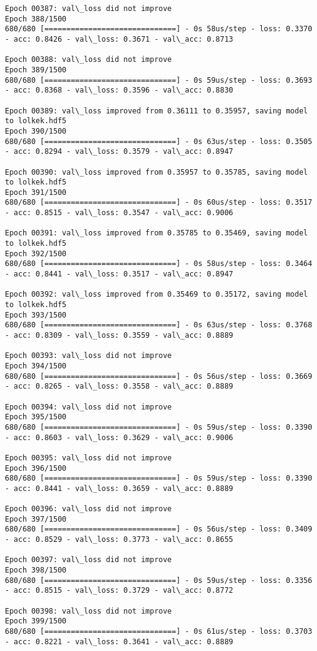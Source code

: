 \documentclass[11pt]{article}
\begin{document}
\begin{Verbatim}[commandchars=\\\{\}]
Epoch 00387: val\_loss did not improve
Epoch 388/1500
680/680 [==============================] - 0s 58us/step - loss: 0.3370 - acc: 0.8426 - val\_loss: 0.3671 - val\_acc: 0.8713

Epoch 00388: val\_loss did not improve
Epoch 389/1500
680/680 [==============================] - 0s 59us/step - loss: 0.3693 - acc: 0.8368 - val\_loss: 0.3596 - val\_acc: 0.8830

Epoch 00389: val\_loss improved from 0.36111 to 0.35957, saving model to lolkek.hdf5
Epoch 390/1500
680/680 [==============================] - 0s 63us/step - loss: 0.3505 - acc: 0.8294 - val\_loss: 0.3579 - val\_acc: 0.8947

Epoch 00390: val\_loss improved from 0.35957 to 0.35785, saving model to lolkek.hdf5
Epoch 391/1500
680/680 [==============================] - 0s 60us/step - loss: 0.3517 - acc: 0.8515 - val\_loss: 0.3547 - val\_acc: 0.9006

Epoch 00391: val\_loss improved from 0.35785 to 0.35469, saving model to lolkek.hdf5
Epoch 392/1500
680/680 [==============================] - 0s 58us/step - loss: 0.3464 - acc: 0.8441 - val\_loss: 0.3517 - val\_acc: 0.8947

Epoch 00392: val\_loss improved from 0.35469 to 0.35172, saving model to lolkek.hdf5
Epoch 393/1500
680/680 [==============================] - 0s 63us/step - loss: 0.3768 - acc: 0.8309 - val\_loss: 0.3559 - val\_acc: 0.8889

Epoch 00393: val\_loss did not improve
Epoch 394/1500
680/680 [==============================] - 0s 56us/step - loss: 0.3669 - acc: 0.8265 - val\_loss: 0.3558 - val\_acc: 0.8889

Epoch 00394: val\_loss did not improve
Epoch 395/1500
680/680 [==============================] - 0s 59us/step - loss: 0.3390 - acc: 0.8603 - val\_loss: 0.3629 - val\_acc: 0.9006

Epoch 00395: val\_loss did not improve
Epoch 396/1500
680/680 [==============================] - 0s 59us/step - loss: 0.3390 - acc: 0.8441 - val\_loss: 0.3659 - val\_acc: 0.8889

Epoch 00396: val\_loss did not improve
Epoch 397/1500
680/680 [==============================] - 0s 56us/step - loss: 0.3409 - acc: 0.8529 - val\_loss: 0.3773 - val\_acc: 0.8655

Epoch 00397: val\_loss did not improve
Epoch 398/1500
680/680 [==============================] - 0s 59us/step - loss: 0.3356 - acc: 0.8515 - val\_loss: 0.3729 - val\_acc: 0.8772

Epoch 00398: val\_loss did not improve
Epoch 399/1500
680/680 [==============================] - 0s 61us/step - loss: 0.3703 - acc: 0.8221 - val\_loss: 0.3641 - val\_acc: 0.8889


\end{Verbatim}
\end{document}

